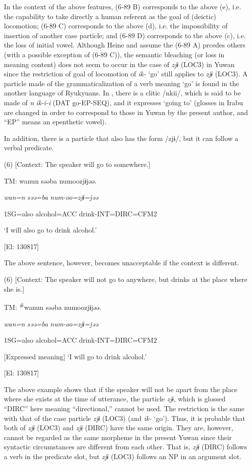 In the context of the above features, (6-89 B) corresponds to the above (e), i.e. the capability to take directly a human referent as the goal of (deictic) locomotion; (6-89 C) corresponds to the above (d), i.e. the impossibility of insertion of another case particle; and (6-89 D) corresponds to the above (c), i.e. the loss of initial vowel. Although Heine and \citet[3]{Kuteva2002} assume the (6-89 A) prcedes others (with a possible exception of (6-89 C)), the semantic bleaching (or loss in meaning content) does not seem to occur in the case of \textit{zjɨ} (LOC3) in Yuwan since the restriction of goal of locomotion of \textit{ik-} ‘go’ still applies to \textit{zjɨ} (LOC3). A particle made of the grammaticalization of a verb meaning ‘go’ is found in the another language of Ryukyuans. In \citet[207]{Shimoji2008}, there is a clitic /nkii/, which is said to be made of \textit{n} \textit{ik-i-i} (DAT go-EP-SEQ), and it expresses ‘going to’ (glosses in Irabu are changed in order to correspond to those in Yuwan by the present author, and “EP” means an epenthetic vowel).

  In addition, there is a particle that also has the form /zjɨ/, but it can follow a verbal predicate.

(6)  [Context: The speaker will go to somewhere.]

  TM:  wanun  səəba  numoozjɨjəə.

    \textit{wan=n}  \textit{səə=ba}  \textit{num-oo=zjɨ=jəə}

    1SG=also  alcohol=ACC  drink-INT=DIRC=CFM2

    ‘I will also go to drink alcohol.’

    [El: 130817]

The above sentence, however, becomes unacceptable if the context is different.

(6)  [Context: The speaker will not go to anywhere, but drinks at the place where she is.]

  TM:  \textsuperscript{\#}wanun  səəba  numoozjɨjəə.

    \textit{wan=n}  \textit{səə=ba}  \textit{num-oo=zjɨ=jəə}

    1SG=also  alcohol=ACC  drink-INT=DIRC=CFM2

    [Expressed meaning] ‘I will go to drink alcohol.’

    [El: 130817]

The above example shows that if the speaker will not be apart from the place where she exists at the time of utterance, the particle \textit{zjɨ}, which is glossed “DIRC” here meaning “directional,” cannot be used. The restriction is the same with that of the case particle \textit{zjɨ} (LOC3) (and \textit{ik-} ‘go’). Thus, it is probable that both of \textit{zjɨ} (LOC3) and \textit{zjɨ} (DIRC) have the same origin. They are, however, cannot be regarded as the same morpheme in the present Yuwan since their syntactic circumstances are different from each other. That is, \textit{zjɨ} (DIRC) follows a verb in the predicate slot, but \textit{zjɨ} (LOC3) follows an NP in an argument slot.

